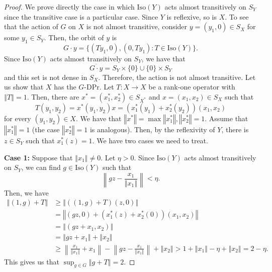 \documentclass[a4paper,12pt]{amsart}
\theoremstyle{definition}
\theoremstyle{definition}
\theoremstyle{remark}
\numberwithin{equation}{section}
\newcommand{\Iso}{\mathrm{Iso}}
\renewcommand{\geq}{\geqslant}
\newcommand{\<}{\langle}
\renewcommand{\>}{\rangle}
\newcommand{\norm}[1]{\left\Vert#1\right\Vert}
\begin{document}
	\begin{proof} We prove directly the case in which $\Iso(Y)$ acts almost transitively on $S_Y$ since the transitive case is a particular case. Since $Y$ is reflexive, so is $X$. To see that the action of $G$ on $X$ is not almost transitive, consider $y = (y_1, 0) \in S_X$ for some $y_1 \in S_Y$. Then, the orbit of $y$ is
		\begin{equation*}
			G \cdot y = \{ (T y_1, 0), (0, T y_1) : T \in \Iso(Y) \}.
		\end{equation*}
		Since $\Iso(Y)$ acts almost transitively on $S_Y$, we have that
		\begin{equation*}
			\overline{G \cdot y} = S_Y \times \{0\} \cup \{0\} \times S_Y
		\end{equation*}
		and this set is not dense in $S_X$. Therefore, the action is not almost transitive. Let us show that $X$ has the $G$-DPr.
		Let $T: X \rightarrow X$ be a rank-one operator with $\norm{T} = 1$.
		Then, there are $x^* = (x_1^*, x_2^*) \in S_{X^*}$ and $x = (x_1, x_2) \in S_X$ such that
		\begin{equation*}
			T(y_1, y_2) = x^*(y_1, y_2) x = (x_1^*(y_1) + x_2^*(y_2)) (x_1, x_2)
		\end{equation*}
		for every $(y_1, y_2) \in X$. We have that $\norm{x^*} = \max{\norm{x_1^*}, \norm{x_2^*}} = 1$. Assume that $\norm{x_1^*} = 1$ (the case $\norm{x_2^*} = 1$ is analogous).
		Then, by the reflexivity of $Y$, there is $z \in S_Y$ such that $x_1^*(z) = 1$.
		We have two cases we need to treat.
		
		
		\noindent
		\textbf{Case 1:} Suppose that $\norm{x_1} \neq 0$.
		Let $\eta>0$. Since $\Iso(Y)$ acts almost transitively on $S_Y$, we can find $g \in \Iso(Y)$ such that
		\begin{equation*}
			\left\|g z - \frac{x_1}{\norm{x_1}}\right\| < \eta.
		\end{equation*}
		Then, we have
		\begin{align*}
			\norm{(1, g) + T}
			&\geq \norm{((1, g) + T)(z, 0)}\\
			&= \norm{\left(gz, 0\right) + (x_1^*(z) + x_2^*(0)) (x_1, x_2)} \\
			&= \norm{\left(gz + x_1, x_2\right)}\\
			&= \norm{gz+x_1}+\norm{x_2}\\
			&\geq
			\left\|\frac{x_1}{\norm{x_1}}+x_1\right\|
			-
			\left\|gz-\frac{x_1}{\norm{x_1}}\right\|
			+
			\norm{x_2} >
			1+\norm{x_1}-\eta+\norm{x_2}
			=
			2-\eta.
		\end{align*}
		This gives us that $\sup_{g\in G}\norm{g+T}=2$.
		

\end{proof}
\end{document}
